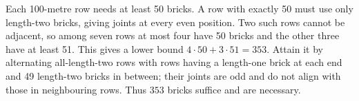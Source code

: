 Each 100-metre row needs at least 50 bricks. A row with exactly 50 must use only length-two bricks, giving joints at every even position. Two such rows cannot be adjacent, so among seven rows at most four have 50 bricks and the other three have at least 51. This gives a lower bound $4\cdot50+3\cdot51=353$. Attain it by alternating all-length-two rows with rows having a length-one brick at each end and 49 length-two bricks in between; their joints are odd and do not align with those in neighbouring rows. Thus $\boxed{353}$ bricks suffice and are necessary.
